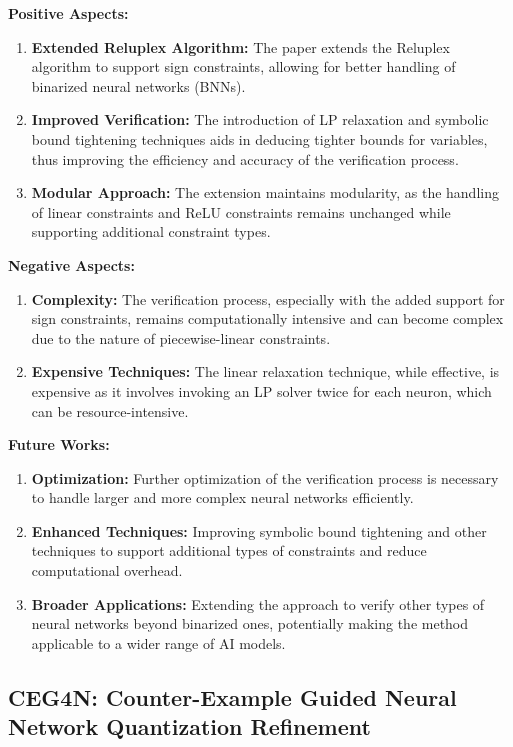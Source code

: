 \documentclass[conference]{IEEEtran}
\begin{document}
\textbf{Positive Aspects:}
\begin{enumerate}
    \item \textbf{Extended Reluplex Algorithm:} The paper extends the Reluplex algorithm to support sign constraints, allowing for better handling of binarized neural networks (BNNs).
    \item \textbf{Improved Verification:} The introduction of LP relaxation and symbolic bound tightening techniques aids in deducing tighter bounds for variables, thus improving the efficiency and accuracy of the verification process.
    \item \textbf{Modular Approach:} The extension maintains modularity, as the handling of linear constraints and ReLU constraints remains unchanged while supporting additional constraint types.
\end{enumerate}

\textbf{Negative Aspects:}
\begin{enumerate}
    \item \textbf{Complexity:} The verification process, especially with the added support for sign constraints, remains computationally intensive and can become complex due to the nature of piecewise-linear constraints.
    \item \textbf{Expensive Techniques:} The linear relaxation technique, while effective, is expensive as it involves invoking an LP solver twice for each neuron, which can be resource-intensive.
\end{enumerate}

\textbf{Future Works:}
\begin{enumerate}
    \item \textbf{Optimization:} Further optimization of the verification process is necessary to handle larger and more complex neural networks efficiently.
    \item \textbf{Enhanced Techniques:} Improving symbolic bound tightening and other techniques to support additional types of constraints and reduce computational overhead.
    \item \textbf{Broader Applications:} Extending the approach to verify other types of neural networks beyond binarized ones, potentially making the method applicable to a wider range of AI models.
\end{enumerate}


\subsection{CEG4N: Counter-Example Guided Neural Network Quantization Refinement \cite{1}}
\end{document}
